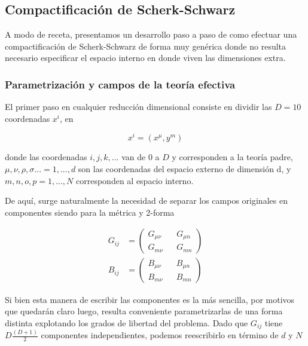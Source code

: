 \documentclass{article}
\numberwithin{equation}{section}
\begin{document}
\subsection{\textcolor{teal!60!white}{Compactificación de Scherk-Schwarz}}

A modo de receta, presentamos un desarrollo paso a paso de como efectuar una compactificación de Scherk-Schwarz de forma muy genérica donde no resulta necesario especificar el espacio interno en donde viven las dimensiones extra.


\subsubsection{Parametrización y campos de la teoría efectiva}


El primer paso en cualquier reducción dimensional consiste en dividir las $ D=10 $ coordenadas $ x^i $, en

\begin{equation}
x^i = (x^{\mu},y^m)
\end{equation}

donde las coordenadas $ i,j,k,... $ van de $ 0 $ a $ D $ y corresponden a la teoría padre, $\mu,\nu,\rho,\sigma...=1,...,d $ son las coordenadas del espacio externo de dimensión d, y $ m,n,o,p=1,...,N $ corresponden al espacio interno.

De aquí, surge naturalmente la necesidad de separar los campos originales en componentes siendo para la métrica y 2-forma

\begin{equation}
\begin{aligned}
G_{i j} &= 
\begin{pmatrix}
G_{\mu \nu} && G_{\mu n}\\
G_{m \nu} && G_{m n}
\end{pmatrix}\\
B_{i j} &= 
\begin{pmatrix}
B_{\mu \nu} && B_{\mu n}\\
B_{m \nu} && B_{m n}
\end{pmatrix}
\end{aligned}
\end{equation}

Si bien esta manera de escribir las componentes es la más sencilla, por motivos que quedarán claro luego, resulta conveniente parametrizarlas de una forma distinta explotando los grados de libertad del problema. Dado que $ G_{i j} $ tiene $ D\frac{\left(D+1\right)}{2} $ componentes independientes, podemos reescribirlo en término de $ d $ y $ N $
\end{document}
